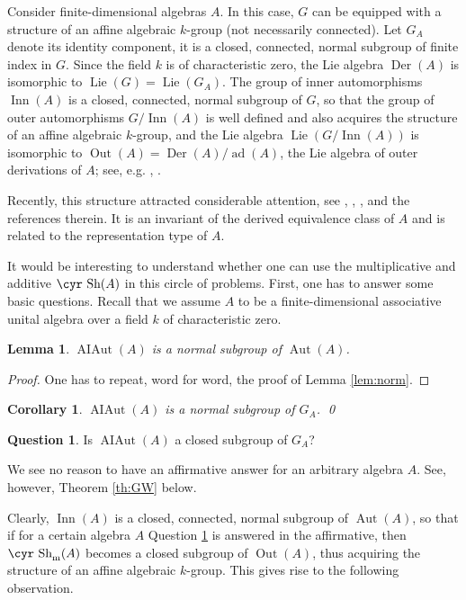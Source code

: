 \documentclass[11pt,reqno]{amsart}
\numberwithin{equation}{section}
\newtheorem{lemma}[theorem]{Lemma}
\newtheorem{cor}[theorem]{Corollary}
\theoremstyle{definition}
\newtheorem{question}[theorem]{Question}
\newcommand{\Aut}{{\operatorname{ Aut}}}
\newcommand{\Inner}{{\operatorname{ Inn}}}
\newcommand{\Out}{{\operatorname{ Out}}}
\newcommand{\AIAut}{{\operatorname{ AIAut}}}
\newcommand{\Der}{{\operatorname{ Der}}}
\newcommand{\ad}{{\operatorname{ ad}}}
\newcommand{\Lie}{{\operatorname{ Lie}}}
\def\Sha{\text{\cyr Sh}}
\def\g{\mathfrak g}
\begin{document}
Consider finite-dimensional algebras $A$. In this case, $G$ can be equipped
with a structure of an affine algebraic $k$-group (not necessarily connected).
Let $G_A$ denote its identity component, it is a closed, connected, normal subgroup of finite index in $G$.
Since the field $k$ is of characteristic zero, the Lie algebra $\Der (A)$ is isomorphic to
$\Lie (G)=\Lie (G_A)$. The group of inner automorphisms $\Inner (A)$ is a closed, connected, normal
subgroup of $G$, so that the group of outer automorphisms $G/\Inner (A)$ is well
defined and also acquires the structure of an affine algebraic $k$-group, and the Lie algebra
$\Lie (G/\Inner (A))$ is isomorphic to $\Out (A)=\Der(A)/\ad(A)$, the Lie algebra of outer derivations of $A$;
see, e.g. \cite[Corollary~13.2]{Hu}, \cite[Proposition~3.1]{Str}.

Recently, this structure attracted considerable attention, see
\cite{CSS}, \cite{ER}, \cite{LRD}, \cite{RDSS} and the references therein.
It is an invariant of the derived equivalence class
of $A$ and is related to the representation type of $A$.

It would be interesting to understand whether one can use the multiplicative and additive $\Sha (A)$ in
this circle of problems. First, one has to answer some basic questions. Recall that we assume $A$ to be a finite-dimensional
associative unital algebra over a field $k$ of characteristic zero.

\begin{lemma}
$\AIAut (A)$ is a normal subgroup of $\Aut (A)$.
\end{lemma}

\begin{proof}
One has to repeat, word for word, the proof of Lemma \ref{lem:norm}.
\end{proof}

\begin{cor}
$\AIAut (A)$ is a normal subgroup of $G_A$. \qed
\end{cor}

\begin{question} \label{q:closed}
Is $\AIAut (A)$ a closed subgroup of $G_A$?
\end{question}

We see no reason to have an affirmative answer for an arbitrary algebra $A$. See, however,
Theorem \ref{th:GW} below.

Clearly, $\Inner (A)$ is a closed, connected, normal subgroup of $\Aut (A)$,
so that if for a certain algebra $A$ Question \ref{q:closed} is answered in the affirmative, then $\Sha_{\text{\rm{m}}}(A)$
becomes a closed subgroup of $\Out (A)$, thus acquiring the structure of an affine algebraic $k$-group.
This gives rise to the following observation. %
\end{document}
